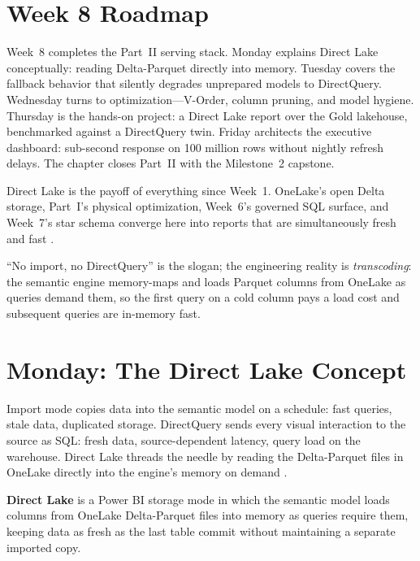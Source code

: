 \section{Week 8 Roadmap}
Week~8 completes the Part~II serving stack. Monday explains Direct Lake conceptually: reading Delta-Parquet directly into memory. Tuesday covers the fallback behavior that silently degrades unprepared models to DirectQuery. Wednesday turns to optimization---V-Order, column pruning, and model hygiene. Thursday is the hands-on project: a Direct Lake report over the Gold lakehouse, benchmarked against a DirectQuery twin. Friday architects the executive dashboard: sub-second response on 100 million rows without nightly refresh delays. The chapter closes Part~II with the Milestone~2 capstone.

Direct Lake is the payoff of everything since Week~1. OneLake's open Delta storage, Part~I's physical optimization, Week~6's governed SQL surface, and Week~7's star schema converge here into reports that are simultaneously fresh and fast \cite{microsoftDirectLake}.

\begin{notebox}
``No import, no DirectQuery'' is the slogan; the engineering reality is \emph{transcoding}: the semantic engine memory-maps and loads Parquet columns from OneLake as queries demand them, so the first query on a cold column pays a load cost and subsequent queries are in-memory fast.
\end{notebox}

\section{Monday: The Direct Lake Concept}
Import mode copies data into the semantic model on a schedule: fast queries, stale data, duplicated storage. DirectQuery sends every visual interaction to the source as SQL: fresh data, source-dependent latency, query load on the warehouse. Direct Lake threads the needle by reading the Delta-Parquet files in OneLake directly into the engine's memory on demand \cite{microsoftDirectLake}.

\begin{definitionbox}
\textbf{Direct Lake} is a Power BI storage mode in which the semantic model loads columns from OneLake Delta-Parquet files into memory as queries require them, keeping data as fresh as the last table commit without maintaining a separate imported copy.
\end{definitionbox}

